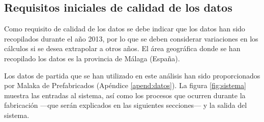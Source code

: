 \subsection{Requisitos iniciales de calidad de los datos}
Como requisito de calidad de los datos se debe indicar que los datos han sido recopilados durante el año 2013, por lo que se deben considerar variaciones en los cálculos si se desea extrapolar a otros años. El área geográfica donde se han recopilado los datos es la provincia de Málaga (España).

Los datos de partida que se han utilizado en este análisis han sido proporcionados por Malaka de Prefabricados (Apéndice \ref{apend:datos}). La figura \ref{fig:sistema} muestra las entradas al sistema, así como los procesos que ocurren durante la fabricación —que serán explicados en las siguientes secciones— y la salida del sistema.
